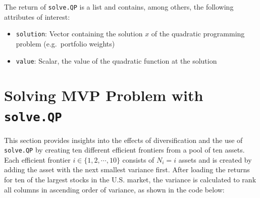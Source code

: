 \documentclass[
  oneside, a4paper, 12pt, openany]{book}
\newenvironment{Shaded}{\begin{snugshade}}{\end{snugshade}}
\newcommand{\AttributeTok}[1]{\textcolor[rgb]{0.77,0.63,0.00}{#1}}
\newcommand{\CommentTok}[1]{\textcolor[rgb]{0.56,0.35,0.01}{\textit{#1}}}
\newcommand{\FunctionTok}[1]{\textcolor[rgb]{0.00,0.00,0.00}{#1}}
\newcommand{\NormalTok}[1]{#1}
\newcommand{\OtherTok}[1]{\textcolor[rgb]{0.56,0.35,0.01}{#1}}
\newcommand{\SpecialCharTok}[1]{\textcolor[rgb]{0.00,0.00,0.00}{#1}}
\newcommand{\StringTok}[1]{\textcolor[rgb]{0.31,0.60,0.02}{#1}}
\providecommand{\tightlist}{%
  \setlength{\itemsep}{0pt}\setlength{\parskip}{0pt}}
\theoremstyle{definition}
\theoremstyle{definition}
\theoremstyle{definition}
\theoremstyle{definition}
\theoremstyle{remark}
\begin{document}
The return of \texttt{solve.QP} is a list and contains, among others, the following attributes of interest:

\begin{itemize}
\tightlist
\item
  \texttt{solution}: Vector containing the solution \(x\) of the quadratic programming problem (e.g.~portfolio weights)
\item
  \texttt{value}: Scalar, the value of the quadratic function at the solution
\end{itemize}

\hypertarget{exampleanalyticalmvp}{%
\section{\texorpdfstring{Solving MVP Problem with \texttt{solve.QP}}{Solving MVP Problem with solve.QP}}\label{exampleanalyticalmvp}}

This section provides insights into the effects of diversification and the use of \texttt{solve.QP} by creating ten different efficient frontiers from a pool of ten assets. Each efficient frontier \(i \in \{1, 2, \cdots, 10\}\) consists of \(N_i = i\) assets and is created by adding the asset with the next smallest variance first. After loading the returns for ten of the largest stocks in the U.S. market, the variance is calculated to rank all columns in ascending order of variance, as shown in the code below:

\vspace{0.1cm}\fontsize{11}{12}\selectfont

\begin{Shaded}
\end{Shaded}
\end{document}
